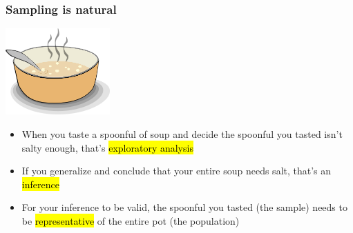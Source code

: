 \documentclass[slidestop,compress,mathserif,12pt,t,professionalfonts,xcolor=table]{beamer}
\begin{document}

\begin{frame}
\frametitle{Sampling is natural}

\begin{center}
\includegraphics[width=0.3\textwidth]{figures/soup}
\end{center}

\begin{itemize}

\item When you taste a spoonful of soup and decide the spoonful you tasted isn't salty 
enough, that's \hl{exploratory analysis}

\item If you generalize and conclude that your entire soup needs salt, that's an \hl{
inference}

\item For your inference to be valid, the spoonful you tasted (the sample) needs to be 
\hl{representative} of the entire pot (the population)

\end{itemize}


\end{frame}
\end{document}
